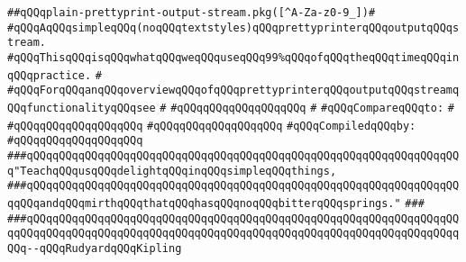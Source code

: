 \label{src/lib/prettyprint/big/src/out/plain-prettyprint-output-stream.pkg}
\verb|##qQQqplain-prettyprint-output-stream.pkg([^A-Za-z0-9_])#|\newline
\verb|#qQQqAqQQqsimpleqQQq(noqQQqtextstyles)qQQqprettyprinterqQQqoutputqQQqstream.|\newline
\verb|#qQQqThisqQQqisqQQqwhatqQQqweqQQquseqQQq99%qQQqofqQQqtheqQQqtimeqQQqinqQQqpractice.|\newline
\verb|#|\newline
\verb|#qQQqForqQQqanqQQqoverviewqQQqofqQQqprettyprinterqQQqoutputqQQqstreamqQQqfunctionalityqQQqsee|\newline
\verb|#|\newline
\verb|#qQQqqQQqqQQqqQQqqQQq|\newline
\verb|#|\newline
\verb|#qQQqCompareqQQqto:|\newline
\verb|#|\newline
\verb|#qQQqqQQqqQQqqQQqqQQq|\newline
\verb|#qQQqqQQqqQQqqQQqqQQq|\newline
\newline
\verb|#qQQqCompiledqQQqby:|\newline
\verb|#qQQqqQQqqQQqqQQqqQQq|\newline
\newline
\verb|###qQQqqQQqqQQqqQQqqQQqqQQqqQQqqQQqqQQqqQQqqQQqqQQqqQQqqQQqqQQqqQQqqQQq"TeachqQQqusqQQqdelightqQQqinqQQqsimpleqQQqthings,|\newline
\verb|###qQQqqQQqqQQqqQQqqQQqqQQqqQQqqQQqqQQqqQQqqQQqqQQqqQQqqQQqqQQqqQQqqQQqqQQqandqQQqmirthqQQqthatqQQqhasqQQqnoqQQqbitterqQQqsprings."|\newline
\verb|###|\newline
\verb|###qQQqqQQqqQQqqQQqqQQqqQQqqQQqqQQqqQQqqQQqqQQqqQQqqQQqqQQqqQQqqQQqqQQqqQQqqQQqqQQqqQQqqQQqqQQqqQQqqQQqqQQqqQQqqQQqqQQqqQQqqQQqqQQqqQQqqQQqqQQq--qQQqRudyardqQQqKipling|\newline
